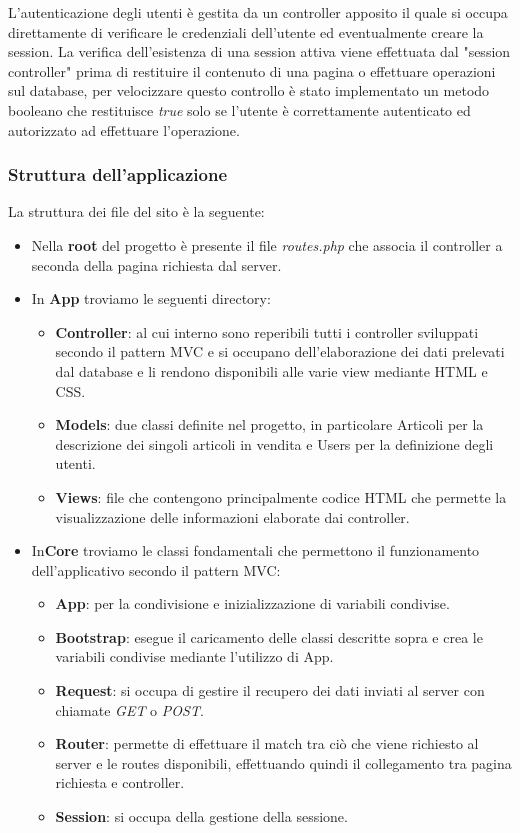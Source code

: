 L’autenticazione degli utenti è gestita da un controller apposito il quale si occupa direttamente di verificare le credenziali dell’utente ed eventualmente creare la session.
La verifica dell’esistenza di una session attiva viene effettuata dal "session controller" prima di restituire il contenuto di una pagina o effettuare operazioni sul database, per velocizzare questo controllo è stato implementato un metodo booleano che restituisce \textit{true} solo se l’utente è correttamente autenticato ed autorizzato ad effettuare l’operazione.
\subsubsection{Struttura dell'applicazione}
La struttura dei file del sito è la seguente:
\begin{itemize}
	\item Nella \textbf{root} del progetto è presente il file \textit{routes.php} che associa il controller a seconda della pagina richiesta dal server.
	\item In \textbf{App} troviamo le seguenti directory:
	\begin{itemize}
		\item \textbf{Controller}: al cui interno sono reperibili tutti i controller sviluppati secondo il pattern MVC e si occupano dell’elaborazione dei dati prelevati dal database e li rendono disponibili alle varie view mediante HTML e CSS.
		\item \textbf{Models}: due classi definite nel progetto, in particolare Articoli per la descrizione dei singoli articoli in vendita e Users per la definizione degli utenti.
		\item \textbf{Views}: file che contengono principalmente codice HTML che permette la visualizzazione delle informazioni elaborate dai controller.
	\end{itemize} 
	\item In\textbf{Core} troviamo le classi fondamentali che permettono il funzionamento dell'applicativo secondo il pattern MVC:
	\begin{itemize}
		\item \textbf{App}: per la condivisione e inizializzazione di variabili condivise.
		\item \textbf{Bootstrap}: esegue il caricamento delle classi descritte sopra e crea le variabili condivise mediante l’utilizzo di App.
		\item \textbf{Request}: si occupa di gestire il recupero dei dati inviati al server con chiamate \textit{GET} o \textit{POST}.
		\item \textbf{Router}: permette di effettuare il match tra ciò che viene richiesto al server e le routes disponibili, effettuando quindi il collegamento tra pagina richiesta e controller.
		\item \textbf{Session}: si occupa della gestione della sessione.
	\end{itemize} 
\end{itemize}

